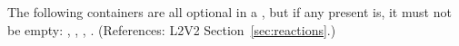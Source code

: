 The following containers are all optional in a \Reaction, but if any
present is, it must not be empty: ,
, , .
(References: L2V2 Section~\ref{sec:reactions}.)
